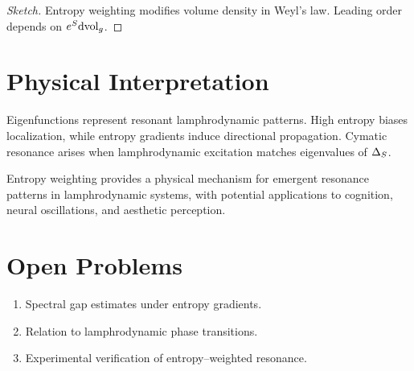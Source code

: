 \begin{proof}[Sketch]
Entropy weighting modifies volume density in Weyl’s law. Leading order
depends on $e^{S}\mathrm{dvol}_g$.
\end{proof}


\section{Physical Interpretation}

Eigenfunctions represent resonant lamphrodynamic patterns. High entropy
biases localization, while entropy gradients induce directional
propagation. Cymatic resonance arises when lamphrodynamic excitation
matches eigenvalues of $\Delta_{S}$.

\begin{remark}
Entropy weighting provides a physical mechanism for emergent resonance
patterns in lamphrodynamic systems, with potential applications to
cognition, neural oscillations, and aesthetic perception.
\end{remark}


\section{Open Problems}

\begin{enumerate}
\item Spectral gap estimates under entropy gradients.
\item Relation to lamphrodynamic phase transitions.
\item Experimental verification of entropy--weighted resonance.
\end{enumerate}

\newpage
